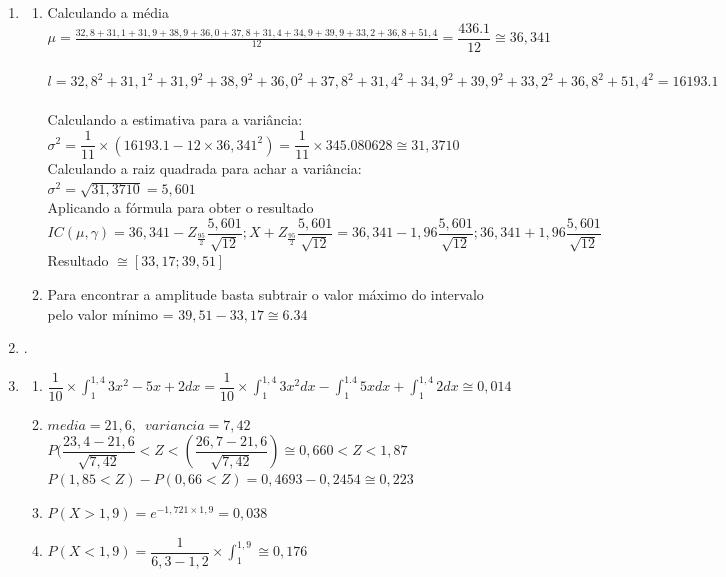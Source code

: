 \documentclass[a4paper, 12pt]{article}
\begin{document}
\begin{enumerate}
\begin{enumerate}
\end{enumerate}

\item \begin{enumerate}
\item Calculando a média\\ $\mu = \frac{32,8 + 31,1 + 31,9 + 38,9 + 36,0 + 37, 8 + 31,4 + 34,9 + 39, 9 + 33, 2 + 36,8 + 51,4}{12} =  \dfrac{436.1}{12} \cong  36,341$ \\ \\ 

$ l = 32,8^2 + 31,1^2 + 31,9^2 + 38,9^2 + 36,0^2 + 37,8^2 + 31,4^2 + 34,9^2 + 39,9^2 + 33,2^2 + 36,8^2 + 51,4^2 = 16193.1 $ \\ \\
Calculando a estimativa para a variância: \\  $\sigma^2 = \dfrac{1}{11} \times (16193.1 - 12 \times 36,341^2) = \dfrac{1}{11} \times 345.080628 \cong 31,3710$\\
Calculando a raiz quadrada para achar a variância: $\sigma^2 = \sqrt{31,3710} = 5,601$ \\
Aplicando a fórmula para obter o resultado
$IC(\mu, \gamma) = 36,341 - Z_{\frac{95}{2}}\dfrac{5,601}{\sqrt{12}}; X +Z_{\frac{95}{2}}\dfrac{5,601}{\sqrt{12}} = 36,341 - 1,96\dfrac{5,601}{\sqrt{12}}; 36,341 + 1,96 \dfrac{5,601}{\sqrt{12}} $
Resultado $\cong [33,17; 39,51]$

\item Para encontrar a amplitude basta subtrair o valor máximo do intervalo pelo valor mínimo = $39,51 - 33,17 \cong 6.34 $
\end{enumerate}
\item .

\item \begin{enumerate}
\item $\dfrac{1}{10}\times \int _1^{1,4}3x^2-5x+2dx = \dfrac{1}{10} \times \int _1^{1,4}3x^2dx-\int _1^{1.4}5xdx+\int _1^{1,4}2dx \cong 0,014$
\item $media = 21,6, \,\,\, variancia = 7,42$\\
$P(\dfrac{23,4-21,6}{\sqrt{7,42}} <Z< (\dfrac{26,7-21,6}{\sqrt{7,42}}) \cong 0,660 < Z < 1,87$\\
$P(1,85< Z) - P(0,66 < Z) = 0,4693 - 0,2454 \cong 0,223$
\item $P(X > 1,9) = e^{-1,721 \times 1,9} = 0,038 $
\item $P(X < 1,9) = \dfrac{1}{6,3 - 1,2} \times \int _1^{1,9} \cong 0,176
$
\end{enumerate}
\end{enumerate}

 
\end{document}
